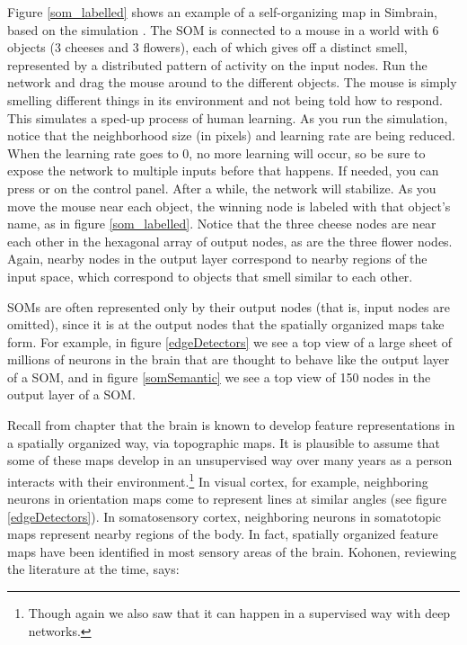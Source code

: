 Figure \ref{som_labelled}  shows an example of a self-organizing map in Simbrain, based on the simulation . The SOM is connected to a mouse in a world with 6 objects (3 cheeses and 3 flowers), each of which gives off a distinct smell, represented by a distributed pattern of activity on the input nodes. Run the network and drag the mouse around to the different objects. The mouse is simply smelling different things in its environment and not being told how to respond. This simulates a sped-up process of human learning. As you run the simulation, notice that the neighborhood size (in pixels) and learning rate are being reduced. When the learning rate goes to 0, no more learning will occur, so be sure to expose the network to multiple inputs before that happens. If needed, you can press  or  on the control panel. After a while, the network will stabilize. As you move the mouse near each object, the winning node is labeled with that object's name, as in figure \ref{som_labelled}. Notice that the three cheese nodes are near each other in the hexagonal array of output nodes, as are the three flower nodes. Again, nearby nodes in the output layer correspond to nearby regions of the input space, which correspond to objects that smell similar to each other.

SOMs are often represented only by their output nodes (that is, input nodes are omitted), since it is at the output nodes that the spatially organized maps take form. For example, in figure \ref{edgeDetectors} we see a top view of a large sheet of millions of neurons in the brain that are thought to behave like the output layer of a SOM, and in figure \ref{somSemantic} we see a top view of 150 nodes in the output layer of a SOM.

Recall from chapter  that the brain is known to develop feature representations in a spatially organized way, via topographic maps. It is plausible to assume that some of these maps develop in an unsupervised way over many years as a person interacts with their environment.\footnote{Though again we also saw that it can happen in a supervised way with deep networks.} In visual cortex, for example, neighboring neurons in orientation maps come to represent lines at similar angles (see figure \ref{edgeDetectors}). In somatosensory cortex, neighboring neurons in somatotopic maps represent nearby regions of the body. In fact, spatially organized feature maps have been identified in most sensory areas of the brain. Kohonen, reviewing the literature at the time, says:

